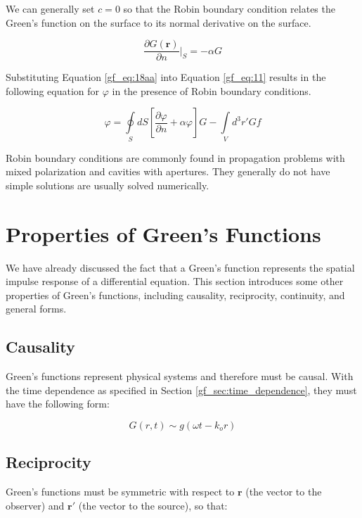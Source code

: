 We can generally set $c=0$ so that the Robin boundary condition relates the Green's function on the surface to its normal derivative on the surface.

\begin{equation}
\frac{\partial G\left(\mathbf{r}\right)}{\partial n}\bigg|_{S} = -\alpha G
\label{gf_eq:18aa}
\end{equation}
\renewcommand{\baselinestretch}{2} \small\normalsize

Substituting Equation \ref{gf_eq:18aa} into Equation \ref{gf_eq:11} results in the following equation for $\varphi$ in the presence of Robin boundary conditions.

\begin{equation}
\boxed{\varphi = \oint\limits_{S}dS\left[\frac{\partial \varphi}{\partial n} + \alpha\varphi \right]G -\int\limits_{V}d^3r' Gf}
\label{gf_eq:18aabb}
\end{equation}
\renewcommand{\baselinestretch}{2} \small\normalsize

Robin boundary conditions are commonly found in propagation problems with mixed polarization and cavities with apertures. They generally do not have simple solutions are usually solved numerically.

\section {Properties of Green's Functions} \label{gf_sec:properties}
We have already discussed the fact that a Green's function represents the spatial impulse response of a differential equation. This section introduces some other properties of Green's functions, including causality, reciprocity, continuity, and general forms.

\subsection {Causality} \label{gf_sec:causality}
Green's functions represent physical systems and therefore must be causal. With the time dependence as specified in Section \ref{gf_sec:time_dependence}, they must have the following form:

\begin{equation}
G\left(r,t\right) \sim g\left(\omega t - k_or\right)
\label{gf_eq:18a}
\end{equation}
\renewcommand{\baselinestretch}{2} \small\normalsize

\subsection {Reciprocity} \label{gf_sec:reciprocity}
Green's functions must be symmetric with respect to $\mathbf{r}$ (the vector to the observer) and $\mathbf{r}'$ (the vector to the source), so that:

